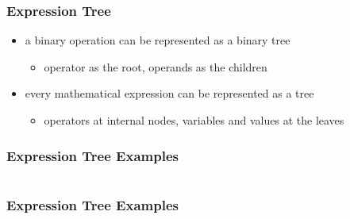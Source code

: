 \documentclass[dvipsnames]{beamer}
\begin{document}
\begin{frame}
  \frametitle{Expression Tree}

  \begin{itemize}
    \item a binary operation can be represented as a binary tree
    \begin{itemize}
      \item operator as the root, operands as the children
    \end{itemize}

    \medskip
    \item every mathematical expression can be represented as a tree
    \begin{itemize}
      \item operators at internal nodes, variables and values at the leaves
    \end{itemize}
  \end{itemize}
\end{frame}

\begin{frame}
  \frametitle{Expression Tree Examples}

  \begin{columns}[t]
    \begin{example}[$7-a$]
      \begin{center}
      \end{center}
    \end{example}

    \begin{example}[$a+b$]
      \begin{center}
      \end{center}
    \end{example}
  \end{columns}
\end{frame}

\begin{frame}
  \frametitle{Expression Tree Examples}

  \begin{columns}[t]
    \begin{example}[$(7-a)/5$]
      \begin{center}
      \end{center}
    \end{example}

    \begin{example}[$(a+b) \uparrow 3$]
      \begin{center}
      \end{center}
    \end{example}
  \end{columns}
\end{frame}
\end{document}
